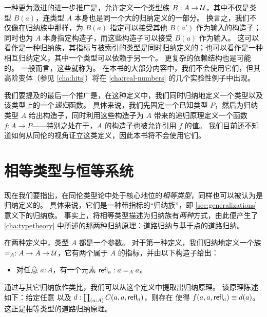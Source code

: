 %
%
一种更为激进的进一步推广是，允许定义一个类型族 $B:A\to \mathcal{U}$，其中不仅是类型 $B(a)$，连类型 $A$ 本身也是同一个大的归纳定义的一部分。
换言之，我们不仅像在归纳族中那样，为 $B(a)$ 指定可以接受其他 $B(a')$ 作为输入的构造子；同时也为 $A$ 本身指定构造子，而这些构造子可以接受 $B(a)$ 作为输入。
这可以看作是一种归纳族，其指标与被索引的类型是同时归纳定义的；也可以看作是一种相互归纳定义，其中一个类型可以依赖于另一个。
更复杂的依赖结构也是可能的。
一般而言，这些就称为。
在本书的大部分内容中，我们不会使用它们，但其高阶变体（参见 \cref{cha:hits}）将在 \cref{cha:real-numbers} 的几个实验性例子中出现。

%
%
我们要提及的最后一个推广是，在这种定义中，我们同时归纳地定义一个类型以及该类型上的一个\emph{递归}函数。
具体来说，我们先固定一个已知类型 $P$，然后为归纳类型 $A$ 给出构造子，同时利用这些构造子为 $A$ 带来的递归原理定义一个函数 $f:A\to P$——特别之处在于，$A$ 的构造子也被允许引用 $f$ 的值。
我们目前还不知道如何从同伦的视角证立这类定义，因此本书将不会使用它们。

%

\section{相等类型与恒等系统}
\label{sec:identity-systems}

%
现在我们要指出，在同伦类型论中处于核心地位的\emph{相等类型}，同样也可以被认为是归纳定义的。
具体来说，它们是一种带指标的``归纳族''，即 \cref{sec:generalizations} 意义下的归纳族。
事实上，将相等类型描述为归纳族有\emph{两种}方式，由此便产生了 \cref{cha:typetheory} 中所述的那两种归纳原理：道路归纳与基于点的道路归纳。

在两种定义中，类型 $A$ 都是一个参数。
对于第一种定义，我们归纳地定义一个族 $=_A : A\to A\to \mathcal{U}$，它有两个属于 $A$ 的指标，并由以下构造子给出：

\begin{itemize}
\item 对任意 $a:A$，有一个元素 $\mathsf{refl}_{a} : a=_A a$。
\end{itemize}

通过与其它归纳族作类比，我们可以从这个定义中提取出归纳原理。
该原理陈述如下：给定任意  以及 $d:\prd{a:A} C(a,a,\refl{a})$，则存在  使得 $f(a,a,\mathsf{refl}_{a})\equiv d(a)$。
这正是相等类型的道路归纳原理。

